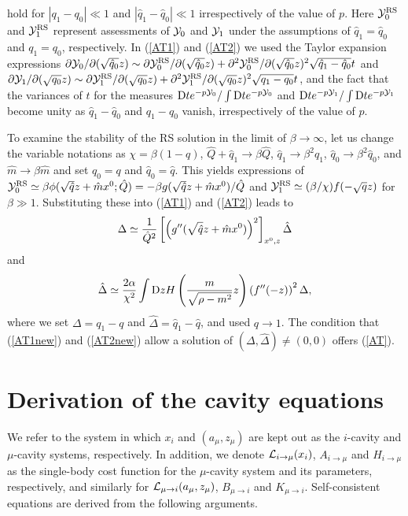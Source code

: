 \documentclass[12pt]{iopart}
\begin{document}
hold for $|q_1-q_0| \ll 1$ and $|\hat{q}_1-\hat{q}_0| \ll 1$ irrespectively of the value of $p$. Here ${\cal Y}_0^{\rm RS}$ and ${\cal Y}_1^{\rm RS}$ represent assessments of ${\cal Y}_0$ and ${\cal Y}_1$ under the assumptions of $\hat{q}_1=\hat{q}_0$ and $q_1=q_0$, respectively. In (\ref{AT1}) and (\ref{AT2}) we used the Taylor expansion expressions $\partial{\cal Y}_0/\partial (\sqrt{\hat{q}_0} z) \sim \partial{\cal Y}_0^{\rm RS} /\partial (\sqrt{\hat{q}_0} z) + \partial^2{\cal Y}_0^{\rm RS} /\partial (\sqrt{\hat{q}_0} z)^2 \sqrt{\hat{q}_1-\hat{q}_0} t$ and $\partial{\cal Y}_1/\partial (\sqrt{{q}_0} z) \sim \partial{\cal Y}_1^{\rm RS} /\partial (\sqrt{{q}_0} z) + \partial^2{\cal Y}_1^{\rm RS} /\partial (\sqrt{{q}_0} z)^2 \sqrt{q_1-q_0} t$, and the fact that the variances of $t$ for the measures ${\rm D}te^{-p {\cal Y}_0}/\int {\rm D}te^{-p {\cal Y}_0}$ and ${\rm D}te^{-p {\cal Y}_1}/\int {\rm D}te^{-p {\cal Y}_1}$ become unity as $\hat{q}_1 - \hat{q}_0$ and $q_1 -q_0$ vanish, irrespectively of the value of $p$.

To examine the stability of the RS solution in the limit of $\beta \to \infty$, let us change the variable notations as $\chi=\beta(1-q)$, $\hat{Q}+\hat{q}_1 \to \beta \hat{Q}$, $\hat{q}_1\to \beta^2 \hat{q}_1$, $\hat{q}_0 \to \beta^2 \hat{q}_0$, and $\hat{m}\to \beta \hat{m}$ and set $q_0=q$ and $\hat{q}_0=\hat{q}$. This yields expressions of ${\cal Y}^{\rm RS}_0 \simeq \beta \phi(\sqrt{\hat{q}}z+\hat{m}x^0; \hat{Q}) = -\beta g(\sqrt{\hat{q}}z+\hat{m}x^0)/\hat{Q}$ and ${\cal Y}_1^{\rm RS} \simeq (\beta/\chi) f(-\sqrt{q}z )$ for $\beta \gg 1$. Substituting these into (\ref{AT1}) and (\ref{AT2}) leads to 
\begin{eqnarray}
\Delta \simeq  \frac{1}{\hat{Q}^2} 
\left [ \left ( g^{\rm \prime \prime}(\sqrt{\hat{q}}z+\hat{m}x^0) \right )^2  \right ]_{x^0,z}
\hat{\Delta} 
\label{AT1new}
\end{eqnarray}
and
\begin{eqnarray}
\hat{\Delta} \simeq  \frac{2\alpha}{\chi^2}
\int {\rm D}z H \left (\frac{m}{\sqrt{\rho-m^2}} z\right )
\left ( f^{\prime \prime} (-z) \right )^2 \Delta,  
\label{AT2new}
\end{eqnarray}
where we set $\Delta=q_1-q$ and $\hat{\Delta}=\hat{q}_1-\hat{q}$, and used $q\to 1$. The condition that (\ref{AT1new}) and (\ref{AT2new}) allow a solution of $(\Delta,\hat{\Delta}) \ne (0,0)$ offers (\ref{AT}). 

\section{Derivation of the cavity equations}
\label{cavity_derivation}
We refer to the system in which $x_i$ and $(a_\mu, z_\mu)$ are kept out as the $i$-cavity and $\mu$-cavity systems, respectively. In addition, we denote ${\cal L}_{i \to \mu}(x_i)$, $A_{i \to \mu}$ and 
$H_{i \to \mu}$ 
as the single-body 
cost function for the $\mu$-cavity system and its parameters, respectively, 
and similarly for ${\cal L}_{\mu \to i}(a_\mu,z_\mu)$, 
$B_{\mu \to i}$ 
and $K_{\mu \to i}$. Self-consistent equations are derived from the following arguments. \\
\end{document}

